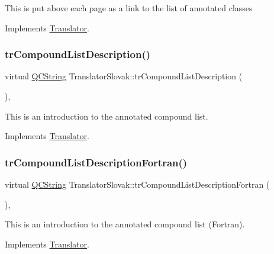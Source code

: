 This is put above each page as a link to the list of annotated classes 

Implements \mbox{\hyperlink{class_translator}{Translator}}.

\mbox{\label{class_translator_slovak_a9d6587d64ff21b0d7bc6b9471a332535}} 
\subsubsection{\texorpdfstring{trCompoundListDescription()}{trCompoundListDescription()}}
{\footnotesize\ttfamily virtual \mbox{\hyperlink{class_q_c_string}{Q\+C\+String}} Translator\+Slovak\+::tr\+Compound\+List\+Description (\begin{DoxyParamCaption}{ }\end{DoxyParamCaption})\hspace{0.3cm}{\ttfamily [inline]}, {\ttfamily [virtual]}}

This is an introduction to the annotated compound list. 

Implements \mbox{\hyperlink{class_translator}{Translator}}.

\mbox{\label{class_translator_slovak_a87f692279b18ee08455fd49ea6b87c26}} 
\subsubsection{\texorpdfstring{trCompoundListDescriptionFortran()}{trCompoundListDescriptionFortran()}}
{\footnotesize\ttfamily virtual \mbox{\hyperlink{class_q_c_string}{Q\+C\+String}} Translator\+Slovak\+::tr\+Compound\+List\+Description\+Fortran (\begin{DoxyParamCaption}{ }\end{DoxyParamCaption})\hspace{0.3cm}{\ttfamily [inline]}, {\ttfamily [virtual]}}

This is an introduction to the annotated compound list (Fortran). 

Implements \mbox{\hyperlink{class_translator}{Translator}}.

